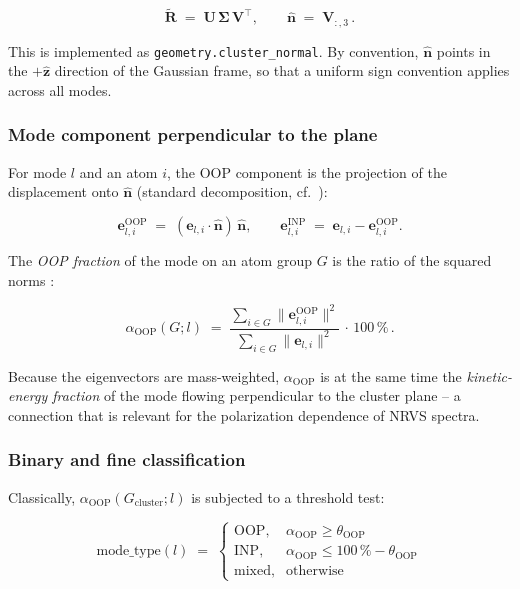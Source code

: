 \documentclass[11pt,a4paper,twoside]{article}
\newcommand{\evec}{\mathbf{e}}
\newcommand{\nhat}{\hat{\mathbf{n}}}
\newcommand{\zhat}{\hat{\mathbf{z}}}
\newcommand{\OOP}{\mathrm{OOP}}
\newcommand{\INP}{\mathrm{INP}}
\theoremstyle{remark}
\begin{document}
\begin{equation}
  \tilde{\mathbf{R}} \;=\; \mathbf{U}\,\boldsymbol{\Sigma}\,\mathbf{V}^\top ,
  \qquad
  \nhat \;=\; \mathbf{V}_{:,3}\,.
  \label{eq:cluster-normal-svd}
\end{equation}

This is implemented as \texttt{geometry.cluster\_normal}.
By convention, $\nhat$ points in the $+\zhat$ direction of the
Gaussian frame, so that a uniform sign convention applies across
all modes.

\subsubsection*{Mode component perpendicular to the plane}

For mode $l$ and an atom $i$, the OOP component is the projection
of the displacement onto $\nhat$ (standard decomposition, cf.\
\cite{Gee2021}):

\begin{equation}
  \evec_{l,i}^{\OOP} \;=\; (\evec_{l,i} \cdot \nhat)\, \nhat ,
  \qquad
  \evec_{l,i}^{\INP} \;=\; \evec_{l,i} - \evec_{l,i}^{\OOP} .
  \label{eq:oop-projektion}
\end{equation}

The \emph{OOP fraction} of the mode on an atom group $G$ is the
ratio of the squared norms \cite{Gee2021}:

\begin{equation}
  \alpha_{\OOP}(G; l) \;=\;
  \frac{\sum_{i \in G} \lVert\evec_{l,i}^{\OOP}\rVert^2}
       {\sum_{i \in G} \lVert\evec_{l,i}\rVert^2} \,\cdot\, 100\,\%
  \,.
  \label{eq:oop-anteil}
\end{equation}

Because the eigenvectors are mass-weighted, $\alpha_{\OOP}$ is at
the same time the \emph{kinetic-energy fraction} of the mode
flowing perpendicular to the cluster plane -- a connection that is
relevant for the polarization dependence of NRVS spectra.

\subsubsection*{Binary and fine classification}

Classically, $\alpha_{\OOP}(G_{\text{cluster}}; l)$ is subjected to
a threshold test:

\begin{equation}
  \text{mode\_type}(l) \;=\;
  \begin{cases}
    \OOP, & \alpha_{\OOP} \geq \theta_{\text{OOP}} \\
    \INP, & \alpha_{\OOP} \leq 100\,\% - \theta_{\text{OOP}} \\
    \text{mixed}, & \text{otherwise}
  \end{cases}
\end{equation}
\end{document}
